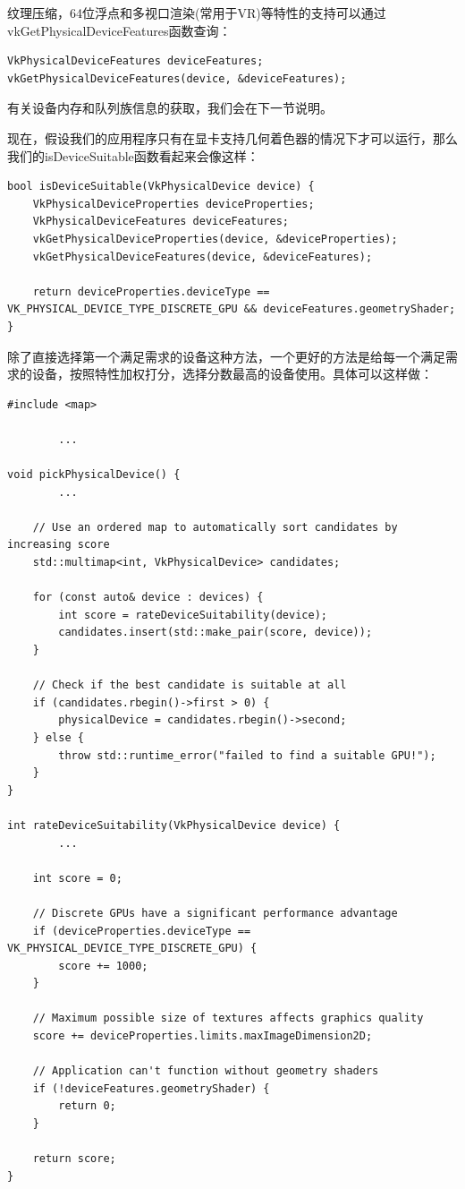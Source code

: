 \documentclass{ctexart}
\begin{document}
纹理压缩，64位浮点和多视口渲染(常用于VR)等特性的支持可以通过vkGetPhysicalDeviceFeatures函数查询：

\begin{lstlisting}[language={[ANSI]C}]
VkPhysicalDeviceFeatures deviceFeatures;
vkGetPhysicalDeviceFeatures(device, &deviceFeatures);
\end{lstlisting}

有关设备内存和队列族信息的获取，我们会在下一节说明。

现在，假设我们的应用程序只有在显卡支持几何着色器的情况下才可以运行，那么我们的isDeviceSuitable函数看起来会像这样：

\begin{lstlisting}[language={[ANSI]C}]
bool isDeviceSuitable(VkPhysicalDevice device) {
	VkPhysicalDeviceProperties deviceProperties;
	VkPhysicalDeviceFeatures deviceFeatures;
	vkGetPhysicalDeviceProperties(device, &deviceProperties);
	vkGetPhysicalDeviceFeatures(device, &deviceFeatures);

	return deviceProperties.deviceType == VK_PHYSICAL_DEVICE_TYPE_DISCRETE_GPU && deviceFeatures.geometryShader;
}
\end{lstlisting}

除了直接选择第一个满足需求的设备这种方法，一个更好的方法是给每一个满足需求的设备，按照特性加权打分，选择分数最高的设备使用。具体可以这样做：

\begin{lstlisting}[language={[ANSI]C}]
#include <map>

		...

void pickPhysicalDevice() {
		...

	// Use an ordered map to automatically sort candidates by increasing score
	std::multimap<int, VkPhysicalDevice> candidates;

	for (const auto& device : devices) {
		int score = rateDeviceSuitability(device);
		candidates.insert(std::make_pair(score, device));
	}

	// Check if the best candidate is suitable at all
	if (candidates.rbegin()->first > 0) {
		physicalDevice = candidates.rbegin()->second;
	} else {
		throw std::runtime_error("failed to find a suitable GPU!");
	}
}

int rateDeviceSuitability(VkPhysicalDevice device) {
		...

	int score = 0;

	// Discrete GPUs have a significant performance advantage
	if (deviceProperties.deviceType == VK_PHYSICAL_DEVICE_TYPE_DISCRETE_GPU) {
		score += 1000;
	}

	// Maximum possible size of textures affects graphics quality
	score += deviceProperties.limits.maxImageDimension2D;

	// Application can't function without geometry shaders
	if (!deviceFeatures.geometryShader) {
		return 0;
	}

	return score;
}
\end{lstlisting}
\end{document}
